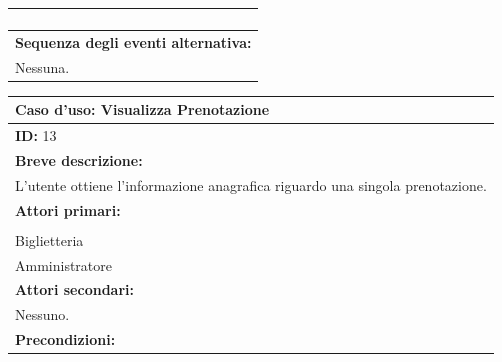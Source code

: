 \documentclass{article}
\begin{document}
\begin{table}[H]
\begin{tabular}{|p{\linewidth}|}
\begin{minipage}{\linewidth}
\begin{enumerate}
                            \end{enumerate}
                        \end{minipage}
                        \vspace{-5pt} \\
                        \hline
                        \textbf{Sequenza degli eventi alternativa:} \\
                        Nessuna. \\
                        \hline
                    \end{tabular}
                \end{table}

                \begin{table}[H]
                    \begin{tabular}{|p{\linewidth}|}
                        \hline
                        \cellcolor{gray!100}
                        \color{white}
                        \centerline{\textbf{Caso d'uso:} Visualizza Prenotazione} \\
                        \hline
                        \textbf{ID:} 13 \\
                        \hline
                        \cellcolor{gray!20}
                        \textbf{Breve descrizione:} \\
                        \cellcolor{gray!20}
                        L'utente ottiene l'informazione anagrafica riguardo una singola prenotazione. \\
                        \hline
                        \textbf{Attori primari:} \\
                        \begin{minipage}{\linewidth}
                            Cliente \\
                            Biglietteria \\
                            Amministratore
                        \end{minipage}
                        \vspace{0pt} \\
                        \hline
                        \textbf{Attori secondari:} \\
                        Nessuno. \\
                        \hline
                        \cellcolor{gray!20}
                        \textbf{Precondizioni:} \\

\end{tabular}
\end{table}
\end{document}
